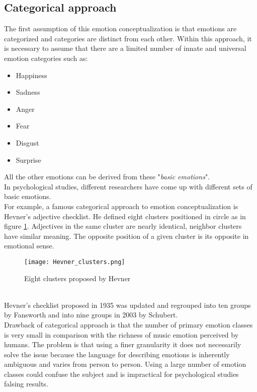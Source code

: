 \subsection{Categorical approach} \label{categorical_approach}
The first assumption of this emotion conceptualization is that emotions are categorized and categories are distinct from each other. Within this approach, it is necessary to assume that there are a limited number of innate and universal emotion categories such as:
\begin{itemize}
	\item Happiness
	\item Sadness
	\item Anger
	\item Fear
	\item Disgust
	\item Surprise
\end{itemize}
All the other emotions can be derived from these "\textit{basic emotions}".
\\
In psychological studies, different researchers have come up with different sets of basic emotions.
\\
For example, a famous categorical approach to emotion conceptualization is Hevner's adjective checklist. He defined eight clusters positioned in circle as in figure \ref{fig:Hevner_clusters}. Adjectives in the same cluster are nearly identical, neighbor clusters have similar meaning. The opposite position of a given cluster is its opposite in emotional sense.
\begin{figure}[h]
    \centering
    \texttt{[image: Hevner\_clusters.png]} 
	\caption{Eight clusters proposed by Hevner}
    \label{fig:Hevner_clusters}
\end{figure}
\\
Hevner's checklist proposed in 1935 was updated and regrouped into ten groups by Fansworth and into nine groups in 2003 by Schubert.
\\ \indent
Drawback of categorical approach is that the number of primary emotion classes is very small in comparison with the richness of music emotion perceived by humans. The problem is that using a finer granularity it does not necessarily solve the issue because the language for describing emotions is inherently ambiguous and varies from person to person. Using a large number of emotion classes could confuse the subject and is impractical for psychological studies falsing results.

